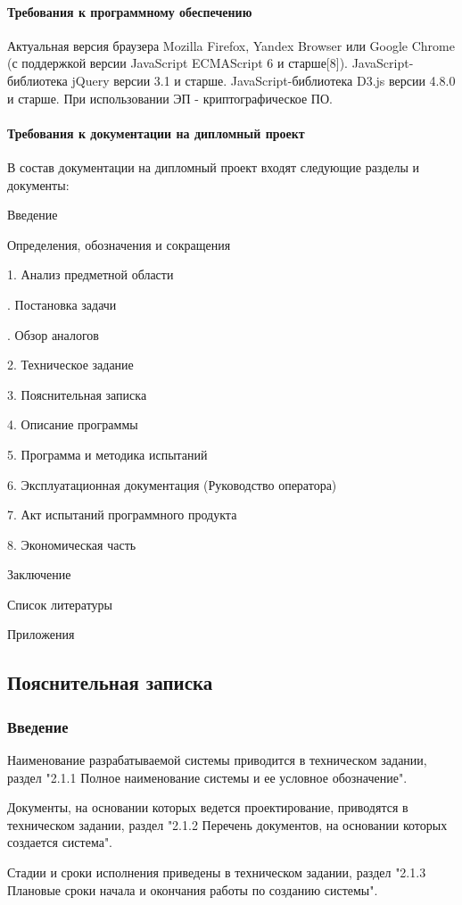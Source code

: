 \documentclass[a4paper]{extarticle}
\numberwithin{equation}{section}
\begin{document}
\paragraph{Требования к программному обеспечению}
Актуальная версия браузера Mozilla Firefox, Yandex Browser или Google Chrome (с поддержкой версии JavaScript ECMAScript 6 и старше[8]). JavaScript-библиотека jQuery версии 3.1 и старше. JavaScript-библиотека D3.js версии 4.8.0 и старше. При использовании ЭП - криптографическое ПО.

\paragraph{Требования к документации на дипломный проект}
В состав документации на дипломный проект входят следующие разделы и документы:\par
Введение\par
\qquad Определения, обозначения и сокращения\par
1.	Анализ предметной области\par
{}.	Постановка задачи\par
{}.	Обзор аналогов\par
2.	Техническое задание\par
3.	Пояснительная записка\par
4.	Описание программы\par
5.	Программа и методика испытаний\par
6.	Эксплуатационная документация (Руководство оператора)\par
7.	Акт испытаний программного продукта\par
8.	Экономическая часть\par
Заключение\par
Список литературы\par
Приложения\par

\subsection{Пояснительная записка}

\subsubsection*{Введение}
Наименование разрабатываемой системы приводится в техническом задании, раздел "2.1.1 Полное наименование системы и ее условное обозначение".\par
Документы, на основании которых ведется проектирование, приводятся в техническом задании, раздел "2.1.2 Перечень документов, на основании которых создается система".\par
Стадии и сроки исполнения приведены в техническом задании, раздел "2.1.3 Плановые сроки начала и окончания работы по созданию системы".
\end{document}
